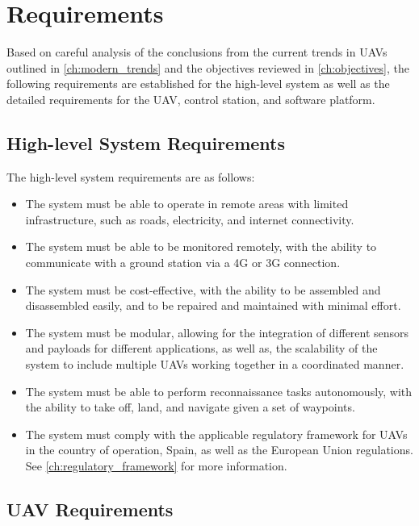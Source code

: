 \chapter{Requirements}

Based on careful analysis of the conclusions from the current trends in UAVs outlined in \autoref{ch:modern_trends} and the objectives reviewed in \autoref{ch:objectives}, the following requirements are established for the high-level system as well as the detailed requirements for the UAV, control station, and software platform.

\section{High-level System Requirements}

The high-level system requirements are as follows:

\begin{itemize}
  \item The system must be able to operate in remote areas with limited infrastructure, such as roads, electricity, and internet connectivity.

  \item The system must be able to be monitored remotely, with the ability to communicate with a ground station via a 4G or 3G connection.

  \item The system must be cost-effective, with the ability to be assembled and disassembled easily, and to be repaired and maintained with minimal effort.

  \item The system must be modular, allowing for the integration of different sensors and payloads for different applications, as well as, the scalability of the system to include multiple UAVs working together in a coordinated manner.

  \item The system must be able to perform reconnaissance tasks autonomously, with the ability to take off, land, and navigate given a set of waypoints.

  \item The system must comply with the applicable regulatory framework for UAVs in the country of operation, Spain, as well as the European Union regulations. See \autoref{ch:regulatory_framework} for more information.
\end{itemize}

\section{UAV Requirements}

